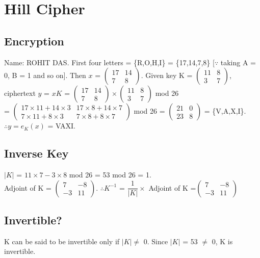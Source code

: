\documentclass[12pt]{article}
\begin{document}
\section{Hill Cipher}
\begin{large}
\subsection{Encryption}
Name: ROHIT DAS. First four letters = \{R,O,H,I\} = \{17,14,7,8\} [$\because$ taking A = 0, B = 1 and so on].
Then $x$ = 
$\begin{pmatrix}
17&14\\7&8
\end{pmatrix}$.
Given key K = $\begin{pmatrix}
11&8\\3&7
\end{pmatrix}$,\\ 
ciphertext $y$ = $xK$ = 
$\begin{pmatrix}
17&14\\7&8
\end{pmatrix}
\times
\begin{pmatrix}
11&8\\3&7
\end{pmatrix}$ mod 26\\
= $\begin{pmatrix}
17\times11+14\times3 & 17\times8+14\times7\\
7\times11+8\times3 & 7\times8+8\times7
\end{pmatrix}$ mod 26
= $\begin{pmatrix}
21&0\\23&8
\end{pmatrix}$
= \{V,A,X,I\}.\\
$\therefore y = e_K(x)$ = VAXI.

\subsection{Inverse Key}
$|K|$ = $11\times7-3\times8$ mod 26 = 53 mod 26 = 1.\\
Adjoint of K
= $\begin{pmatrix}
7&-8\\-3&11
\end{pmatrix}$.
$\therefore K^{-1}$
= $\dfrac{1}{|K|}\times$ Adjoint of K 
=$\begin{pmatrix}
7&-8\\-3&11
\end{pmatrix}$

\subsection{Invertible?}
K can be said to be invertible only if $|K| \ne$ 0. Since $|K|$ = 53 $\ne$ 0, K is invertible.


\end{large}
\end{document}
